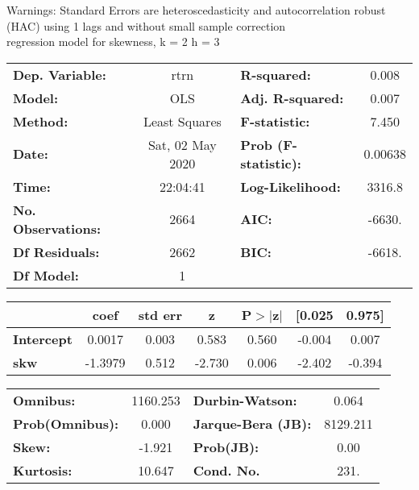 Warnings: \newline
 [1] Standard Errors are heteroscedasticity and autocorrelation robust (HAC) using 1 lags and without small sample correction\\ 

regression model for skewness, k = 2 h = 3\begin{center}
\begin{tabular}{lclc}
\toprule
\textbf{Dep. Variable:}    &       rtrn       & \textbf{  R-squared:         } &     0.008   \\
\textbf{Model:}            &       OLS        & \textbf{  Adj. R-squared:    } &     0.007   \\
\textbf{Method:}           &  Least Squares   & \textbf{  F-statistic:       } &     7.450   \\
\textbf{Date:}             & Sat, 02 May 2020 & \textbf{  Prob (F-statistic):} &  0.00638    \\
\textbf{Time:}             &     22:04:41     & \textbf{  Log-Likelihood:    } &    3316.8   \\
\textbf{No. Observations:} &        2664      & \textbf{  AIC:               } &    -6630.   \\
\textbf{Df Residuals:}     &        2662      & \textbf{  BIC:               } &    -6618.   \\
\textbf{Df Model:}         &           1      & \textbf{                     } &             \\
\bottomrule
\end{tabular}
\begin{tabular}{lcccccc}
                   & \textbf{coef} & \textbf{std err} & \textbf{z} & \textbf{P$> |$z$|$} & \textbf{[0.025} & \textbf{0.975]}  \\
\midrule
\textbf{Intercept} &       0.0017  &        0.003     &     0.583  &         0.560        &       -0.004    &        0.007     \\
\textbf{skw}       &      -1.3979  &        0.512     &    -2.730  &         0.006        &       -2.402    &       -0.394     \\
\bottomrule
\end{tabular}
\begin{tabular}{lclc}
\textbf{Omnibus:}       & 1160.253 & \textbf{  Durbin-Watson:     } &    0.064  \\
\textbf{Prob(Omnibus):} &   0.000  & \textbf{  Jarque-Bera (JB):  } & 8129.211  \\
\textbf{Skew:}          &  -1.921  & \textbf{  Prob(JB):          } &     0.00  \\
\textbf{Kurtosis:}      &  10.647  & \textbf{  Cond. No.          } &     231.  \\
\bottomrule
\end{tabular}
\end{center}

